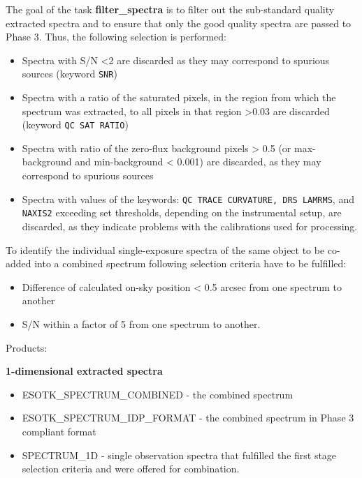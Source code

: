 The goal of the task {\bf filter\_spectra} is to filter out the sub-standard quality extracted spectra and to ensure that only the good quality spectra are passed to Phase 3. Thus, the following selection is performed:

\begin{itemize}
\item Spectra with S/N <2 are discarded as they may correspond to spurious sources (keyword {\tt SNR})
\item  Spectra with a ratio of the saturated pixels, in the region from which the  spectrum was extracted, to all pixels in that region >0.03 are discarded (keyword {\tt QC SAT RATIO})
\item Spectra with ratio of the zero-flux background pixels > 0.5 (or max-background and min-background < 0.001) are discarded, as they may correspond to spurious sources
\item Spectra with values of the keywords: {\tt QC TRACE CURVATURE, DRS LAMRMS}, and {\tt NAXIS2} exceeding set thresholds, depending on the instrumental setup, are discarded, as they indicate problems with the calibrations used for processing.

\end{itemize}

To identify the individual single-exposure spectra of the same object to be co-added into a combined spectrum following selection criteria have to be fulfilled:

\begin{itemize}
\item Difference of calculated on-sky position < 0.5 arcsec from one spectrum to another
\item S/N within a factor of 5 from one spectrum to another.
\end{itemize}

Products:

{\bf 1-dimensional extracted spectra}

\begin{itemize}
\item ESOTK\_SPECTRUM\_COMBINED - the combined spectrum
\item ESOTK\_SPECTRUM\_IDP\_FORMAT - the combined spectrum in Phase 3 compliant format
\item SPECTRUM\_1D - single observation spectra that fulfilled the first stage selection criteria and were offered for combination.

\end{itemize}

